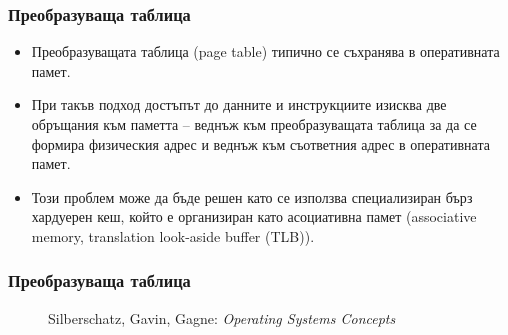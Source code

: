 \documentclass[ignorenonframetext, hyperref=unicode]{beamer}
\begin{document}
\begin{frame}
\frametitle{Преобразуваща таблица}
\begin{itemize}
  \item Преобразуващата таблица (page table) типично се съхранява в оперативната
  памет.
  \item При такъв подход достъпът до данните и инструкциите изисква две
  обръщания към паметта -- веднъж към преобразуващата таблица за да се формира
  физическия адрес и веднъж към съответния адрес в оперативната памет.
  \item Този проблем може да бъде решен като се използва специализиран бърз
  хардуерен кеш, който е организиран като асоциативна памет (associative
  memory, translation look-aside buffer (TLB)).
\end{itemize}
\end{frame}

\begin{frame}
\frametitle{Преобразуваща таблица}
\begin{figure}[h]
\center
{}
\caption{Silberschatz, Gavin, Gagne: {\em Operating Systems Concepts}}
\end{figure}
\end{frame}
\end{document}
